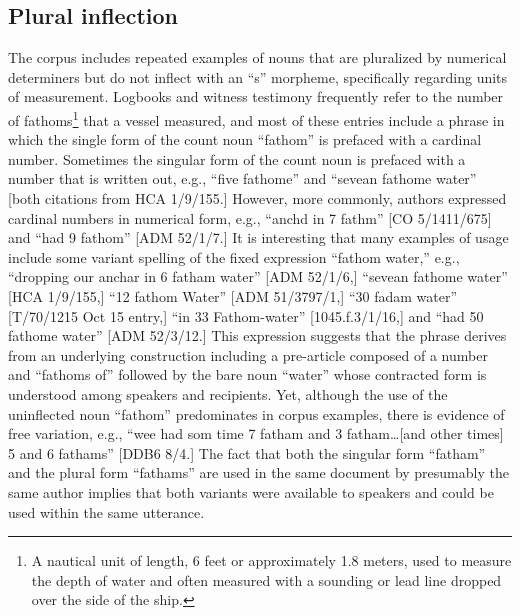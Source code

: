 \subsection{{Plural} {inflection}}%

The corpus includes repeated examples of nouns that are pluralized by numerical determiners but do not inflect with an “s” morpheme, specifically regarding units of measurement. Logbooks and witness testimony frequently refer to the number of fathoms\footnote{A nautical unit of length, 6 feet or approximately 1.8 meters, used to measure the depth of water and often measured with a sounding or lead line dropped over the side of the ship.} that a vessel measured, and most of these entries include a phrase in which the single form of the count noun “fathom” is prefaced with a cardinal number. Sometimes the singular form of the count noun is prefaced with a number that is written out, e.g., “five fathome” and “sevean fathome water” [both citations from HCA 1/9/155.] However, more commonly, authors expressed cardinal numbers in numerical form, e.g., “anchd in 7 fathm” [CO 5/1411/675] and “had 9 fathom” [ADM 52/1/7.] It is interesting that many examples of usage include some variant spelling of the fixed expression “fathom water,” e.g., “dropping our anchar in 6 fatham water” [ADM 52/1/6,] “sevean fathome water” [HCA 1/9/155,] “12 fathom Water” [ADM 51/3797/1,] “30 fadam water” [T/70/1215 Oct 15 entry,] “in 33 Fathom-water” [1045.f.3/1/16,] and “had 50 fathome water” [ADM 52/3/12.] This expression suggests that the phrase derives from an underlying construction including a pre-article composed of a number and “fathoms of” followed by the bare noun “water” whose contracted form is understood among speakers and recipients. Yet, although the use of the uninflected noun “fathom” predominates in corpus examples, there is evidence of free variation, e.g., “wee had som time 7 fatham and 3 fatham…[and other times] 5 and 6 fathams” [DDB6 8/4.] The fact that both the singular form “fatham” and the plural form “fathams” are used in the same document by presumably the same author implies that both variants were available to speakers and could be used within the same utterance. 

